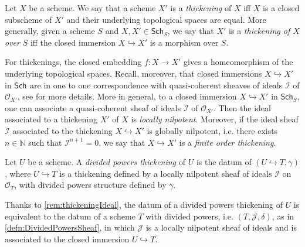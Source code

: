 \begin{defn}[Thickening]
	Let $X$ be a scheme.
	We say that a scheme $X'$ is a {\em thickening} of $X$ iff
	$X$ is a closed subscheme of $X'$ and their underlying topological
	spaces are equal.
	More generally, given a scheme $S$ and $X, X' \in \mathsf{Sch}_{ S }$,
	we say that $X'$ is a {\em thickening of $X$ over} $S$ iff
	the closed immersion $X \hookrightarrow X'$ is a morphism over $S$.
\end{defn}


\begin{rem}[]\label{rem:thickeningIdeal}
	For thickenings, the closed embedding $f\colon X \to X'$ gives a homeomorphism
	of the underlying topological spaces.
	Recall, moreover, that closed immersions $X \hookrightarrow X'$ in $\mathsf{Sch}_{  }$
	are in one to one correspondence with quasi-coherent sheaves of ideals
	$\mathcal{I}$ of $\mathcal{O}_{ X' }$, see
	\cite[\href{https://stacks.math.columbia.edu/tag/01QN}{Section 01QN}]{SP}
	for more details.
	More in general, to a closed immersion $X \hookrightarrow X'$ in
	$\mathsf{Sch}_{ S }$, one can associate a quasi-coherent sheaf of ideals
	$\mathcal{I}$ of $\mathcal{O}_{ X' }$.
	Then the ideal associated to a thickening $X'$ of $X$ 
	is {\em locally nilpotent}.
	Moreover, if the ideal sheaf $\mathcal{I}$ associated to the thickening
	$X \hookrightarrow X'$ is globally nilpotent, i.e. there exists $n \in \mathbb{N}$
	such that $\mathcal{I}^{n+1} = 0$, we say that $X \hookrightarrow X'$ 
	is a {\em finite order thickening}.
\end{rem}


\begin{defn}\label{defn:PDThickening}
	Let $U$ be a scheme. A {\em divided powers thickening} of $U$ 
	is the datum of $\left(U \hookrightarrow T, \gamma\right)$,
	where $U \hookrightarrow T$ is a thickening defined by a locally nilpotent
	sheaf of ideals $\mathcal{I}$ on $\mathcal{O}_T$, 
	with divided powers structure defined by $\gamma$.
\end{defn}


\begin{rem}[]\label{rem:EquivPDThickening}
	Thanks to \cref{rem:thickeningIdeal}, the datum of a
	divided powers thickening of $U$ is equivalent to the datum of
	a scheme $T$ with divided powers, i.e.
	$\left(T, \mathcal{J}, \delta\right)$, as in \cref{defn:DividedPowersSheaf},
	in which $\mathcal{J}$ is a locally nilpotent sheaf of ideals
	and is associated to the closed immersion $U \hookrightarrow T$.
\end{rem}


